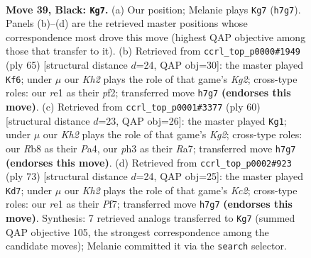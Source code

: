 \documentclass[11pt]{article}
\begin{document}
\clearpage

\begin{figure}[p]\centering
\begin{subfigure}{0.46\textwidth}\centering
\resizebox{\linewidth}{!}{%
\newchessgame
\chessboard[
  setfen={1r6/1p3p1k/p3p3/8/P3PK2/5P1P/1R5P/4R3 b - - 8 39},
  showmover=false,
  pgfstyle=straightmove, color=movearrow, markmove={h7-g7}
]}
\caption{}
\end{subfigure}\hfill
\begin{subfigure}{0.46\textwidth}\centering
\resizebox{\linewidth}{!}{%
\newchessgame
\chessboard[
  setfen={1r6/5pk1/4p3/pP5p/2p2P2/2P1P3/4KP2/1R6 b - - 2 33},
  showmover=false,
  pgfstyle=straightmove, color=movearrow, markmove={g7-f6}
]}
\caption{}
\end{subfigure}
\\[4pt]
\begin{subfigure}{0.46\textwidth}\centering
\resizebox{\linewidth}{!}{%
\newchessgame
\chessboard[
  setfen={8/Rp3p2/4pk1p/8/P4P2/4P3/1r3PK1/8 w - - 1 31},
  showmover=false,
  pgfstyle=straightmove, color=movearrow, markmove={g2-g1}
]}
\caption{}
\end{subfigure}\hfill
\begin{subfigure}{0.46\textwidth}\centering
\resizebox{\linewidth}{!}{%
\newchessgame
\chessboard[
  setfen={r7/2k1pp2/6p1/2K4p/p1P4P/4P3/R4PP1/8 b - - 1 37},
  showmover=false,
  pgfstyle=straightmove, color=movearrow, markmove={c7-d7}
]}
\caption{}
\end{subfigure}
\caption{\textbf{Move 39, Black: \texttt{Kg7}.} (a) Our position; Melanie plays \texttt{Kg7} (\texttt{h7g7}). Panels (b)--(d) are the retrieved master positions whose correspondence most drove this move (highest QAP objective among those that transfer to it). (b) Retrieved from \texttt{ccrl\_top\_p0000\#1949} (ply 65) [structural distance $d$=24, QAP obj=30]: the master played \texttt{Kf6}; under $\mu$ our \emph{Kh2} plays the role of that game's \emph{Kg2}; cross-type roles: our \emph{r}e1 as their \emph{p}f2; transferred move \texttt{h7g7} \textbf{(endorses this move)}. (c) Retrieved from \texttt{ccrl\_top\_p0001\#3377} (ply 60) [structural distance $d$=23, QAP obj=26]: the master played \texttt{Kg1}; under $\mu$ our \emph{Kh2} plays the role of that game's \emph{Kg2}; cross-type roles: our \emph{R}b8 as their \emph{P}a4, our \emph{p}h3 as their \emph{R}a7; transferred move \texttt{h7g7} \textbf{(endorses this move)}. (d) Retrieved from \texttt{ccrl\_top\_p0002\#923} (ply 73) [structural distance $d$=24, QAP obj=25]: the master played \texttt{Kd7}; under $\mu$ our \emph{Kh2} plays the role of that game's \emph{Kc2}; cross-type roles: our \emph{r}e1 as their \emph{P}f7; transferred move \texttt{h7g7} \textbf{(endorses this move)}. Synthesis: 7 retrieved analogs transferred to \texttt{Kg7} (summed QAP objective 105, the strongest correspondence among the candidate moves); Melanie committed it via the \texttt{search} selector.}
\label{fig:thought-m77}
\end{figure}
\end{document}
